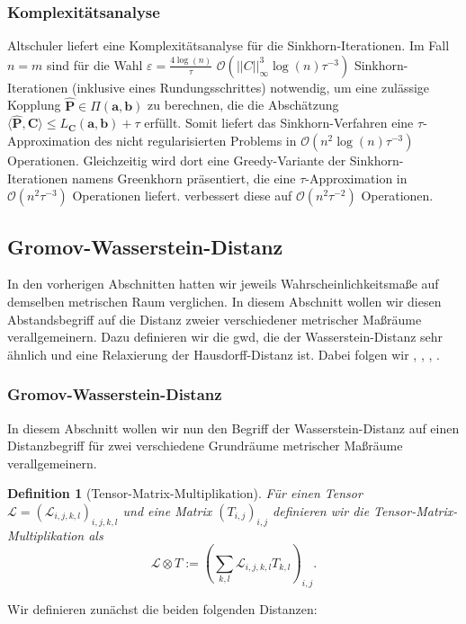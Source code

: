 \documentclass[twoside, 12pt,a4paper]{book}
\newtheorem{definition}[theorem]{Definition}
\numberwithin{equation}{section}
\begin{document}
	\subsubsection{Komplexitätsanalyse}
	Altschuler \cite{altschuler2017near} liefert eine Komplexitätsanalyse für die Sinkhorn-Iterationen. Im Fall $n=m$ sind für die Wahl $\varepsilon = \frac{4 \log (n)}{\tau}$ $\mathcal{O}(||C||_\infty^3 \log (n)\tau ^{-3})$ Sinkhorn-Iterationen (inklusive eines Rundungsschrittes) notwendig, um eine zulässige Kopplung $\hat{\boldsymbol{P}} \in \Pi(\boldsymbol{a}, \boldsymbol{b})$ zu berechnen, die die Abschätzung \\ $\langle \hat{\boldsymbol{P}}, \boldsymbol{C} \rangle \leq L_{\boldsymbol{C}}(\boldsymbol{a}, \boldsymbol{b}) +  \tau$ erfüllt. Somit liefert das Sinkhorn-Verfahren eine $\tau$-Approximation des nicht regularisierten Problems in $\mathcal{O}(n^2 \log (n)\tau ^{-3})$ Operationen.
	Gleichzeitig wird dort eine Greedy-Variante der Sinkhorn-Iterationen namens Greenkhorn präsentiert, die eine $\tau$-Ap\-pro\-xi\-ma\-tion in $\mathcal{O}(n^2\tau^{-3})$ Operationen liefert.
	\cite{dvurechensky2018computational} verbessert diese auf $\mathcal{O}(n^2\tau^{-2})$ Operationen.
	\subsection{Gromov-Wasserstein-Distanz}\label{gwd}
	In den vorherigen Abschnitten hatten wir jeweils Wahrscheinlichkeitsmaße auf demselben metrischen Raum verglichen. In diesem Abschnitt wollen wir diesen Abstandsbegriff auf die Distanz zweier verschiedener metrischer Maßräume verallgemeinern. Dazu definieren wir die \acf{gwd}, die der Wasserstein-Distanz sehr ähnlich und eine Relaxierung der Hausdorff-Distanz ist. Dabei folgen wir \cite{COTcuturi}, \cite{vayer2020contribution}, \cite{vayer2020fused}, \cite{gwd_averaging_kernels}.
	
	\subsubsection{Gromov-Wasserstein-Distanz}
	In diesem Abschnitt wollen wir nun den Begriff der Wasserstein-Distanz auf einen Distanzbegriff für zwei verschiedene Grundräume metrischer Maßräume verallgemeinern.
	
	\begin{definition}[Tensor-Matrix-Multiplikation]
		Für einen Tensor $\mathcal{L} = (\mathcal{L}_{i,j,k,l})_{i,j,k,l}$ und eine Matrix $(T_{i,j})_{i,j}$ definieren wir die Tensor-Matrix-Mul\-ti\-pli\-ka\-tion als
		\begin{equation}
		\mathcal{L} \otimes T := \left(\sum_{k,l}{\mathcal{L}_{i,j,k,l}T_{k,l}}\right)_{i,j}. \label{eq:tensor_matrix_mul}
		\end{equation}
	\end{definition}
	\noindent Wir definieren zunächst die beiden folgenden Distanzen:
	
\end{document}
